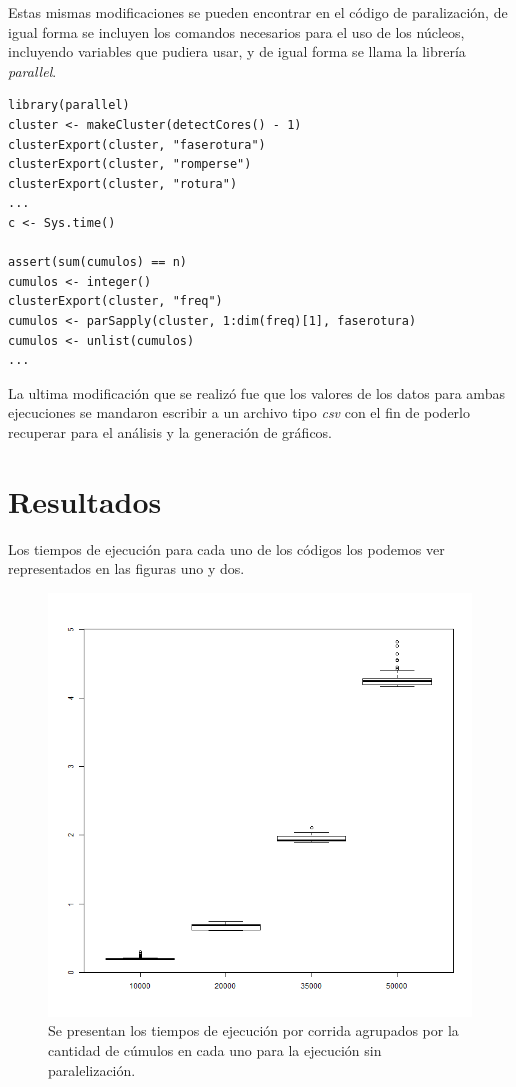 \documentclass[a4paper]{article}
\begin{document}
Estas mismas modificaciones se pueden encontrar en el código de paralización, de igual forma se incluyen los comandos necesarios para el uso de los núcleos, incluyendo variables que pudiera usar, y de igual forma se llama la librería \textit{parallel}.

\begin{lstlisting}[frame=single]
library(parallel)
cluster <- makeCluster(detectCores() - 1)
clusterExport(cluster, "faserotura")
clusterExport(cluster, "romperse")
clusterExport(cluster, "rotura")
...
c <- Sys.time()

assert(sum(cumulos) == n)
cumulos <- integer()
clusterExport(cluster, "freq")
cumulos <- parSapply(cluster, 1:dim(freq)[1], faserotura)
cumulos <- unlist(cumulos)
...
\end{lstlisting}

La ultima modificación que se realizó fue que los valores de los datos para ambas ejecuciones se mandaron escribir a un archivo tipo \textit{csv} con el fin de poderlo recuperar para el análisis y la generación de gráficos.
\section{Resultados}
Los tiempos de ejecución para cada uno de los códigos los podemos ver representados en las figuras uno y dos.
\begin{figure}[h]
\centering
\includegraphics[width=0.7\linewidth]{Vnoparalelo}
\caption{Se presentan los tiempos de ejecución por corrida agrupados por la cantidad de cúmulos en cada uno para la ejecución sin paralelización.}
\label{fig:Vnoparalelo}
\end{figure}
\end{document}
